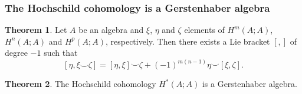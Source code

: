 \documentclass{beamer}
\theoremstyle{definition}
\newtheorem{teorema}{Theorem}
\newtheorem{defi}{Definition}
\begin{document}
\begin{frame}
	\frametitle{The Hochschild cohomology is a Gerstenhaber algebra}
	
	\begin{teorema}
		Let $A$ be an algebra and $\xi$, $\eta$ and $\zeta$ elements of $H^m(A;A)$, $H^n(A;A)$ and $H^p(A;A)$, respectively. Then there exists a Lie bracket $[,]$ of degree $-1$ such that
		\[
		[\eta, \xi\smile \zeta]=[\eta,\xi]\smile \zeta+(-1)^{m(n-1)}\eta\smile[\xi,\zeta].
		\]
	\end{teorema}\pause
	\begin{teorema}
	The Hochschild cohomology $H^*(A;A)$ is a Gerstenhaber algebra.
\end{teorema} 
\end{frame}
%	
%
\end{document}
